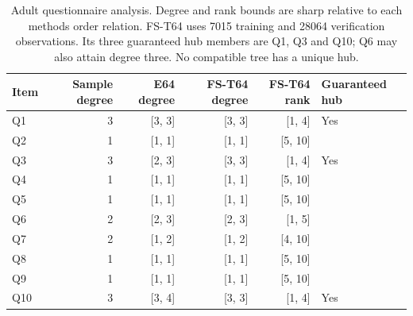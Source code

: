 \begin{table}[htbp]\centering
\caption{Adult questionnaire analysis. Degree and rank bounds are sharp relative to each method\textquotesingle s order relation. FS-T64 uses 7015 training and 28064 verification observations. Its three guaranteed hub members are Q1, Q3 and Q10; Q6 may also attain degree three. No compatible tree has a unique hub.}\label{tab:rse}
\begin{tabular}{lrrrrl}\toprule Item & Sample degree & E64 degree & FS-T64 degree & FS-T64 rank & Guaranteed hub\\\midrule
Q1 & 3 & [3, 3] & [3, 3] & [1, 4] & Yes\\
Q2 & 1 & [1, 1] & [1, 1] & [5, 10] & \\
Q3 & 3 & [2, 3] & [3, 3] & [1, 4] & Yes\\
Q4 & 1 & [1, 1] & [1, 1] & [5, 10] & \\
Q5 & 1 & [1, 1] & [1, 1] & [5, 10] & \\
Q6 & 2 & [2, 3] & [2, 3] & [1, 5] & \\
Q7 & 2 & [1, 2] & [1, 2] & [4, 10] & \\
Q8 & 1 & [1, 1] & [1, 1] & [5, 10] & \\
Q9 & 1 & [1, 1] & [1, 1] & [5, 10] & \\
Q10 & 3 & [3, 4] & [3, 3] & [1, 4] & Yes\\
\bottomrule\end{tabular}\end{table}

